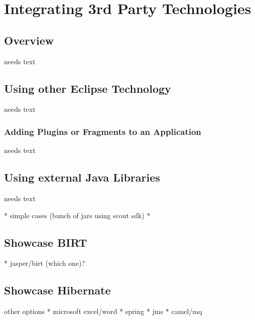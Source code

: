 \documentclass[a4paper,10pt,twoside]{book}
\begin{document}
  \sloppy
\fi


\chapter{Integrating 3rd Party Technologies}

\section{Overview}
needs text

\section{Using other Eclipse Technology}
needs text

\subsection{Adding Plugins or Fragments to an Application}
needs text

\section{Using external Java Libraries}
needs text

  * simple cases (bunch of jars using scout sdk)
  * 
  
\section{Showcase BIRT}
  * jasper/birt (which one)?
  
\section{Showcase Hibernate}  

other options
  * microsoft excel/word
  * spring
  * jms
  * camel/mq
 
 
\ifx\wholebook\relax\else
   
   
\end{document}
